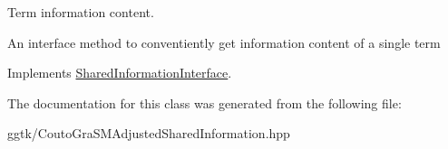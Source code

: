 Term information content. 

An interface method to conventiently get information content of a single term 

Implements \hyperlink{classSharedInformationInterface_aba102c0e44fbc098baef6074f1eb37b6}{Shared\+Information\+Interface}.



The documentation for this class was generated from the following file\+:\begin{DoxyCompactItemize}
\item 
ggtk/Couto\+Gra\+S\+M\+Adjusted\+Shared\+Information.\+hpp\end{DoxyCompactItemize}
